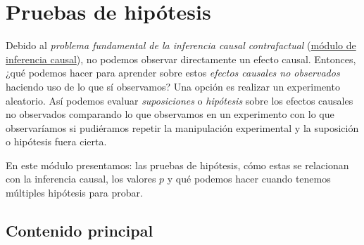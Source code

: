 \documentclass[12pt,spanish,]{book}
\begin{document}
\hypertarget{pruebas-de-hipuxf3tesis}{%
\chapter{Pruebas de hipótesis}\label{pruebas-de-hipuxf3tesis}}

Debido al \emph{problema fundamental de la inferencia causal contrafactual} (\href{inferencia-causal.html}{módulo de inferencia causal}), no podemos observar directamente un efecto causal. Entonces, ¿qué podemos hacer para aprender sobre estos \emph{efectos causales no observados} haciendo uso de lo que sí observamos? Una opción es realizar un experimento aleatorio. Así podemos evaluar \emph{suposiciones} o \emph{hipótesis} sobre los efectos causales no observados comparando lo que observamos en un experimento con lo que observaríamos si pudiéramos repetir la manipulación experimental y la suposición o hipótesis fuera cierta.

En este módulo presentamos: las pruebas de hipótesis, cómo estas se relacionan con la inferencia causal, los valores \(p\) y qué podemos hacer cuando tenemos múltiples hipótesis para probar.

\hypertarget{contenido-principal-3}{%
\section{Contenido principal}\label{contenido-principal-3}}
\end{document}
